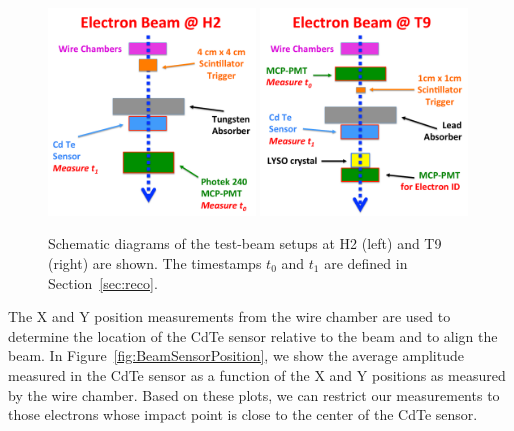 \begin{figure}[htbp] 
\centering
\includegraphics[width=0.49\textwidth]{figures/H2_BeamSchematicDiagram.pdf} 
\includegraphics[width=0.49\textwidth]{figures/T9_BeamSchematicDiagram.pdf} 
\caption{Schematic diagrams of the test-beam setups at H2 (left) and T9 (right) are shown. 
The timestamps $t_0$ and $t_1$ are defined in Section~\ref{sec:reco}.} 
\label{fig:BeamSchematicDiagram} 
\end{figure} 


The X and Y position measurements from the wire chamber are used to determine the location
of the CdTe sensor relative to the beam and to align the beam. In 
Figure~\ref{fig:BeamSensorPosition}, we show the average amplitude measured in the
CdTe sensor as a function of the X and Y positions as measured by the wire chamber. Based
on these plots, we can restrict our measurements to those electrons whose impact point is close
to the center of the CdTe sensor.

